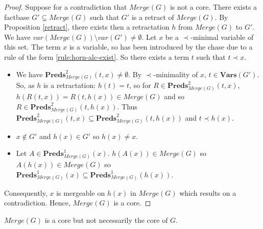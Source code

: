 \documentclass{article}
\theoremstyle{definition}
\theoremstyle{remark}
\newcommand{\Vars}{\textbf{Vars}}
\newcommand{\Preds}{\textbf{Preds}}
\newcommand{\Merge}{\textit{Merge}}
\begin{document}
\begin{proof}
Suppose for a contradiction that $\Merge(G)$ is not a core. There exists a factbase $G' \subsetneq \Merge(G)$ such that $G'$ is a retract of $\Merge(G)$. By Proposition \ref{retract}, there exists then a retractation $h$ from $\Merge(G)$ to $G'$. We have $var(\Merge(G))\setminus var(G') \neq \emptyset$. Let $x$ be a $\prec$-minimal variable of this set. The term $x$ is a variable, so has been introduced by the chase due to a rule of the form \ref{rule:horn-alc-exist}. So there exists a term $t$ such that $t \prec x$. 
\begin{itemize}
\item We have $\Preds^2_{\Merge(G)}(t,x) \neq \emptyset$. By $\prec$-minimality of $x$, $t \in \Vars(G')$. So, as $h$ is a retractation: $h(t) = t$, so for $R \in \Preds^2_{\Merge(G)}(t,x)$, $h(R(t,x)) = R(t,h(x)) \in \Merge(G)$ and so $R \in \Preds^2_{\Merge(G)}(t,h(x))$. Thus $\Preds^2_{\Merge(G)}(t,x) \subseteq \Preds^2_{\Merge(G)}(t,h(x))$ and $t \prec h(x)$.
\item $x \notin G'$ and $h(x) \in G'$ so $h(x) \neq x$. 
\item Let $A \in \Preds^1_{\Merge(G)}(x)$. $h(A(x)) \in \Merge(G)$ so $A(h(x)) \in \Merge(G)$ so $\Preds^1_{\Merge(G)}(x) \subseteq \Preds^1_{\Merge(G)}(h(x))$. 
\end{itemize}
Consequently, $x$ is mergeable on $h(x)$ in $\Merge(G)$ which results on a contradiction. Hence, $\Merge(G)$ is a core.
\end{proof}	

$\Merge(G)$ is a core but not necessarily the core of $G$.
\end{document}
